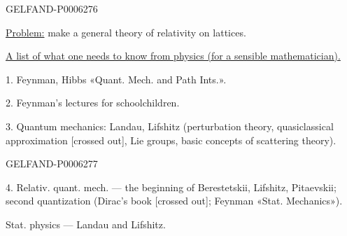 \begin{GelfandAdjacentEvidence}{GELFAND-P000627}{6}

\underline{Problem:} make a general theory of relativity on lattices.

\underline{A list of what one needs to know from physics (for a sensible mathematician).}

1. Feynman, Hibbs «Quant. Mech. and Path Ints.».

2. Feynman’s lectures for schoolchildren.

3. Quantum mechanics: Landau, Lifshitz (perturbation theory, quasiclassical approximation
[crossed out], Lie groups, basic concepts of scattering theory).
\end{GelfandAdjacentEvidence}
\begin{GelfandAdjacentEvidence}{GELFAND-P000627}{7}


4. Relativ. quant. mech. --- the beginning of Berestetskii, Lifshitz, Pitaevskii; second quantization
(Dirac’s book [crossed out]; Feynman «Stat. Mechanics»).
\end{GelfandAdjacentEvidence}


Stat. physics --- Landau and Lifshitz.



